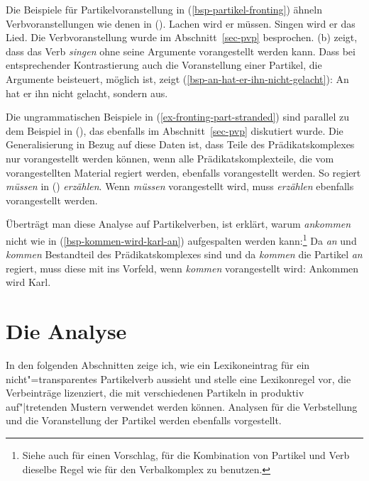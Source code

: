 \noindent
Die Beispiele für Partikelvoranstellung in (\ref{bsp-partikel-fronting}) ähneln Verbvoranstellungen wie denen in ().
\eal
\ex Lachen wird er müssen.
\ex Singen wird er das Lied.
\zl
Die Verbvoranstellung wurde im Abschnitt~\ref{sec-pvp} besprochen. (b) zeigt,
dass das Verb \emph{singen} ohne seine Argumente vorangestellt werden kann.
Dass bei entsprechender Kontrastierung auch die Voranstellung einer Partikel,
die Argumente beisteuert, möglich ist, zeigt (\ref{bsp-an-hat-er-ihn-nicht-gelacht}):
\ea
\label{bsp-an-hat-er-ihn-nicht-gelacht}
An hat er ihn nicht gelacht, sondern aus.
\z

\noindent
Die ungrammatischen Beispiele in (\ref{ex-fronting-part-stranded}) sind
parallel zu dem Beispiel in (), das ebenfalls im Abschnitt~\ref{sec-pvp}
diskutiert wurde.
\label{ex-muessen-wird-er-ihr-zwei}
\z
Die Generalisierung in Bezug auf diese Daten ist, dass Teile des Prädikatskomplexes
nur vorangestellt werden können, wenn alle Prädikatskomplexteile, die vom vorangestellten
Material regiert werden, ebenfalls vorangestellt werden.
So regiert \zb \emph{müssen} in () \emph{erzählen}.
Wenn \emph{müssen} vorangestellt wird, muss \emph{erzählen} ebenfalls vorangestellt werden.

Überträgt man diese Analyse auf Partikelverben, ist erklärt, warum \zb \emph{ankommen}
nicht wie in (\ref{bsp-kommen-wird-karl-an}) aufgespalten werden kann:\footnote{
  Siehe auch  für einen Vorschlag, für die
  Kombination von Partikel und Verb dieselbe Regel wie für den Verbalkomplex zu benutzen.%
}
Da \emph{an} und \emph{kommen}
Bestandteil des Prädikatskomplexes sind und da \emph{kommen} die Partikel \emph{an} regiert,
muss diese mit ins Vorfeld, wenn \emph{kommen} vorangestellt wird:
\ea
Ankommen wird Karl.
\z
{}



\section{Die Analyse}
\label{sec-pv-anal}

In den folgenden Abschnitten zeige ich, wie ein Lexikoneintrag
für ein nicht"=transparentes Partikelverb aussieht und stelle
eine Lexikonregel vor, die Verbeinträge lizenziert, die mit verschiedenen
Partikeln in produktiv auf"|tretenden Mustern verwendet werden können.
Analysen für die Verbstellung und die Voranstellung der Partikel
werden ebenfalls vorgestellt.

